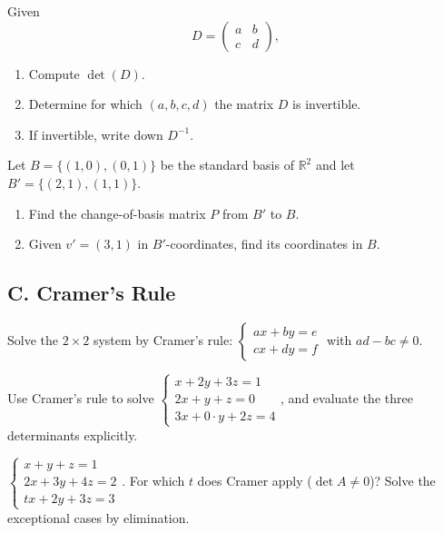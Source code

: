 \documentclass[11pt]{article}
\begin{document}
\begin{problem}
Given
\[
D =
\begin{pmatrix}
a & b \\
c & d
\end{pmatrix},
\]
\begin{enumerate}
    \item Compute $\det(D)$.
    \item Determine for which $(a,b,c,d)$ the matrix $D$ is invertible.
    \item If invertible, write down $D^{-1}$.
\end{enumerate}
\end{problem}

\begin{problem}
Let $B = \{(1,0), (0,1)\}$ be the standard basis of $\mathbb{R}^2$ and let
$B' = \{(2,1), (1,1)\}$.
\begin{enumerate}
    \item Find the change-of-basis matrix $P$ from $B'$ to $B$.
    \item Given $v' = (3,1)$ in $B'$-coordinates, find its coordinates in $B$.
\end{enumerate}
\end{problem}
\subsection*{C. Cramer’s Rule}
\begin{problem}
Solve the $2\times2$ system by Cramer’s rule:
$\begin{cases} ax+by=e\\ cx+dy=f\end{cases}$ with $ad-bc\neq 0$.
\end{problem}

\begin{problem}
Use Cramer’s rule to solve
$\begin{cases}
x+2y+3z=1\\
2x+y+z=0\\
3x+0\cdot y+2z=4
\end{cases}$,
and evaluate the three determinants explicitly.
\end{problem}

\begin{problem}
$\begin{cases}
x+y+z=1\\
2x+3y+4z=2\\
tx+2y+3z=3
\end{cases}$.
For which $t$ does Cramer apply ($\det A\neq 0$)? Solve the exceptional cases by elimination.
\end{problem}
\end{document}
